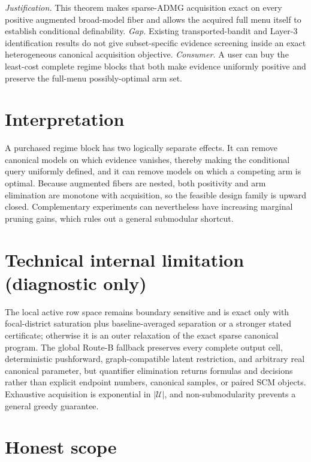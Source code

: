 \documentclass{article}
\begin{document}
\par\smallskip\noindent \textit{Justification.} This theorem makes sparse-ADMG acquisition exact on every positive augmented broad-model fiber and allows the acquired full menu itself to establish conditional definability. \textit{Gap.} Existing transported-bandit and Layer-3 identification results do not give subset-specific evidence screening inside an exact heterogeneous canonical acquisition objective. \textit{Consumer.} A user can buy the least-cost complete regime blocks that both make evidence uniformly positive and preserve the full-menu possibly-optimal arm set.

\section{Interpretation}

A purchased regime block has two logically separate effects.  It can remove canonical models on which evidence vanishes, thereby making the conditional query uniformly defined, and it can remove models on which a competing arm is optimal.  Because augmented fibers are nested, both positivity and arm elimination are monotone with acquisition, so the feasible design family is upward closed.  Complementary experiments can nevertheless have increasing marginal pruning gains, which rules out a general submodular shortcut.

\section*{Technical internal limitation (diagnostic only)}

The local active row space remains boundary sensitive and is exact only with focal-district saturation plus baseline-averaged separation or a stronger stated certificate; otherwise it is an outer relaxation of the exact sparse canonical program.  The global Route-B fallback preserves every complete output cell, deterministic pushforward, graph-compatible latent restriction, and arbitrary real canonical parameter, but quantifier elimination returns formulas and decisions rather than explicit endpoint numbers, canonical samples, or paired SCM objects.  Exhaustive acquisition is exponential in \(|\mathcal U|\), and non-submodularity prevents a general greedy guarantee.

\section{Honest scope}
\end{document}
